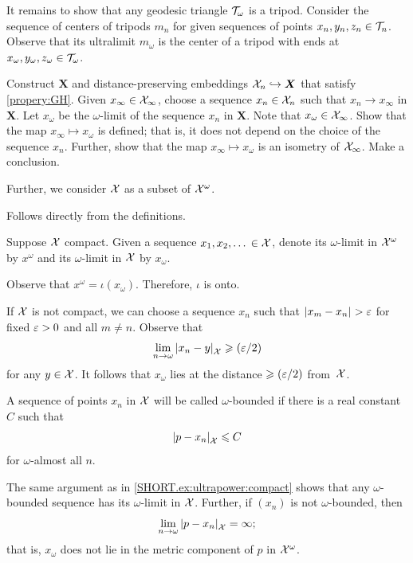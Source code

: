 It remains to show that any geodesic triangle $\mathcal{T}_\omega$ is a tripod.
Consider the sequence of centers of tripods $m_n$ for given sequences of points $x_n,y_n,z_n\in \mathcal{T}_n$.
Observe that its ultralimit $m_\omega$ is the center of a tripod with ends at $x_\omega,y_\omega,z_\omega\in \mathcal{T}_\omega$.

Construct $\bm{X}$ and distance-preserving embeddings $\mathcal{X}_n\hookrightarrow\bm{X}$ that satisfy \ref{propery:GH}.
Given $x_\infty\in \mathcal{X}_\infty$, choose a sequence $x_n\in \mathcal{X}_n$ such that $x_n\to x_\infty$ in $\bm{X}$.
Let $x_\omega$ be the $\omega$-limit of the sequence $x_n$ in $\bm{X}$.
Note that $x_\omega\in \mathcal{X}_\infty$.
Show that the map $x_\infty\mapsto x_\omega$ is defined; that is, it does not depend on the choice of the sequence $x_n$.
Further, show that the map $x_\infty\mapsto x_\omega$ is an isometry of $\mathcal{X}_\infty$.
Make a conclusion.

Further, we consider $\mathcal{X}$ as a subset of $\mathcal{X}^\omega$.

 Follows directly from the definitions.

Suppose $\mathcal{X}$ compact.
Given a sequence $x_1,x_2,\dots{}\in\mathcal{X}$, denote its $\omega$-limit in $\mathcal{X}^\omega$ by $x^\omega$ and its $\omega$-limit in $\mathcal{X}$ by $x_\omega$.

Observe that $x^\omega=\iota(x_\omega)$.
Therefore, $\iota$ is onto.

If $\mathcal{X}$ is not compact, we can choose a sequence $x_n$ such that $\dist{x_m}{x_n}{}>\eps$ for fixed $\varepsilon>0$ and all $m\ne n$.
Observe that
\[\lim_{n\to\omega}\dist{x_n}{y}{\spc{X}}\ge \tfrac\eps2\]
for any $y\in\mathcal{X}$.
It follows that $x_\omega$ lies at the distance $\geqslant(\varepsilon/2)$ from~$\mathcal{X}$.

A sequence of points $x_n$ in $\mathcal{X}$ will be called $\omega$-bounded if there is a real constant $C$ such that
\[\dist{p}{x_n}{\spc{X}}\le C\] 
for $\omega$-almost all $n$.

The same argument as in \ref{SHORT.ex:ultrapower:compact} shows that any $\omega$-bounded sequence has its $\omega$-limit in $\mathcal{X}$.
Further, if $(x_n)$ is not  $\omega$-bounded, then 
\[\lim_{n\to\omega}\dist{p}{x_n}{\spc{X}}=\infty;\]
that is, $x_\omega$ does not lie in the metric component of $p$ in $\mathcal{X}^\omega$.

